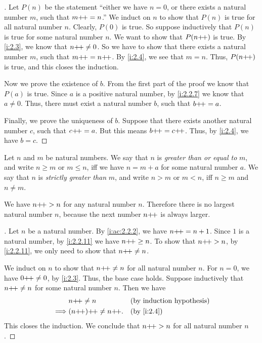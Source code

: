 \begin{proof}[]
  Let \(P(n)\) be the statement ``either we have \(n = 0\), or there exists a natural number \(m\), such that \(m{+}\!{+} = n\).''
  We induct on \(n\) to show that \(P(n)\) is true for all natural number \(n\).
  Clearly, \(P(0)\) is true.
  So suppose inductively that \(P(n)\) is true for some natural number \(n\).
  We want to show that \(P(n{+}\!{+})\) is true.
  By \cref{i:2.3}, we know that \(n{+}\!{+} \neq 0\).
  So we have to show that there exists a natural number \(m\), such that \(m{+}\!{+} = n{+}\!{+}\).
  By \cref{i:2.4}, we see that \(m = n\).
  Thus, \(P(n{+}\!{+})\) is true, and this closes the induction.

  Now we prove the existence of \(b\).
  From the first part of the proof we know that \(P(a)\) is true.
  Since \(a\) is a positive natural number, by \cref{i:2.2.7} we know that \(a \neq 0\).
  Thus, there must exist a natural number \(b\), such that \(b{+}\!{+} = a\).

  Finally, we prove the uniqueness of \(b\).
  Suppose that there exists another natural number \(c\), such that \(c{+}\!{+} = a\).
  But this means \(b{+}\!{+} = c{+}\!{+}\).
  Thus, by \cref{i:2.4}, we have \(b = c\).
\end{proof}

\begin{defn}\label{i:2.2.11}
  Let \(n\) and \(m\) be natural numbers.
  We say that \(n\) is \emph{greater than or equal to} \(m\), and write \(n \geq m\) or \(m \leq n\), iff we have \(n = m + a\) for some natural number \(a\).
  We say that \(n\) is \emph{strictly greater than} \(m\), and write \(n > m\) or \(m < n\), iff \(n \geq m\) and \(n \neq m\).
\end{defn}

\begin{ac}\label{i:ac:2.2.3}
  We have \(n{+}\!{+} > n\) for any natural number \(n\).
  Therefore there is no largest natural number \(n\), because the next number \(n{+}\!{+}\) is always larger.
\end{ac}

\begin{proof}[]
  Let \(n\) be a natural number.
  By \cref{i:ac:2.2.2}, we have \(n{+}\!{+} = n + 1\).
  Since \(1\) is a natural number, by \cref{i:2.2.11} we have \(n{+}\!{+} \geq n\).
  To show that \(n{+}\!{+} > n\), by \cref{i:2.2.11}, we only need to show that \(n{+}\!{+} \neq n\).

  We induct on \(n\) to show that \(n{+}\!{+} \neq n\) for all natural number \(n\).
  For \(n = 0\), we have \(0{+}\!{+} \neq 0\), by \cref{i:2.3}.
  Thus, the base case holds.
  Suppose inductively that \(n{+}\!{+} \neq n\) for some natural number \(n\).
  Then we have
  \begin{align*}
             & n\pp \neq n          &  & \byIH      \\
    \implies & (n\pp)\pp \neq n\pp. &  & \by{i:2.4}
  \end{align*}
  This closes the induction.
  We conclude that \(n{+}\!{+} > n\) for all natural number \(n\).
\end{proof}

